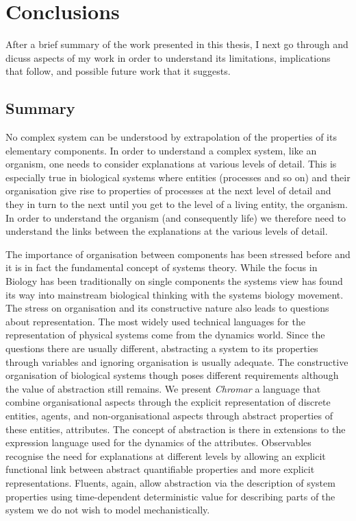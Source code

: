 \documentclass[phd]{infthesis}
\begin{document}
\chapter{Conclusions}
After a brief summary of the work presented in this thesis, I next go through
and dicuss aspects of my work in order to understand its limitations,
implications that follow, and possible future work that it suggests.

\section{Summary}
No complex system can be understood by extrapolation of the properties of its
elementary components. In order to understand a complex system, like an
organism, one needs to consider explanations at various levels of detail. This
is especially true in biological systems where entities (processes and so on)
and their organisation give rise to properties of processes at the next level of
detail and they in turn to the next until you get to the level of a living
entity, the organism. In order to understand the organism (and consequently
life) we therefore need to understand the links between the explanations at the
various levels of detail.

The importance of organisation between components has been stressed before and
it is in fact the fundamental concept of systems theory. While the focus in
Biology has been traditionally on single components the systems view has found
its way into mainstream biological thinking with the systems biology
movement. The stress on organisation and its constructive nature also leads to
questions about representation. The most widely used technical languages for the
representation of physical systems come from the dynamics world. Since the
questions there are usually different, abstracting a system to its properties
through variables and ignoring organisation is usually adequate. The
constructive organisation of biological systems though poses different
requirements although the value of abstraction still remains. We present
\emph{Chromar} a language that combine organisational aspects through the
explicit representation of discrete entities, agents, and non-organisational
aspects through abstract properties of these entities, attributes. The concept
of abstraction is there in extensions to the expression language used for the
dynamics of the attributes. Observables recognise the need for explanations at
different levels by allowing an explicit functional link between abstract
quantifiable properties and more explicit representations. Fluents, again, allow
abstraction via the description of system properties using time-dependent
deterministic value for describing parts of the system we do not wish to model
mechanistically.
\end{document}
